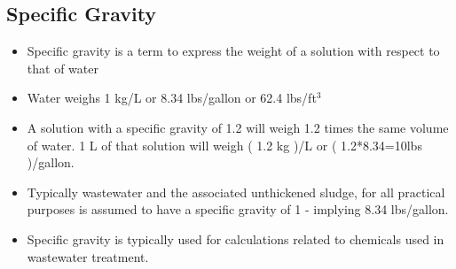 \subsection{Specific Gravity}				
			\begin{itemize}
				\item Specific gravity is a term to express the weight of a solution with respect to that of water
				\item Water weighs 1 kg/L or 8.34 lbs/gallon or 62.4 lbs/ft$^3$
				\item A solution with a specific gravity of 1.2 will weigh 1.2 times the same volume of water.  1 L of that solution will weigh ( 1.2 kg )/L  or  ( 1.2*8.34=10lbs )/gallon.
				\item Typically wastewater and the associated unthickened sludge, for all practical purposes is assumed to have a specific gravity of 1 - implying 8.34 lbs/gallon.
				\item Specific gravity is typically used for calculations related to chemicals used in wastewater treatment.
			\end{itemize}
